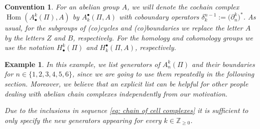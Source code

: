 \documentclass[10pt,a4paper]{amsart}
\numberwithin{equation}{section}
\newtheorem{Example}[Theorem]{Example}
\newtheorem{conve}[Theorem]{Convention}
\newcommand{\ZZ }{\mathbb{Z}}
\DeclareMathOperator{\Hom}{Hom}
\begin{document}
\begin{conve}
 For an abelian group $A$, we will denote the cochain complex $\Hom(A^k_\bullet(\Pi),A)$ by $A_k^\bullet(\Pi,A)$ with coboundary operators $\delta_k^{n-1}:=\big(\partial_n^k\big)^*$. As usual, for the subgroups of (co)cycles and (co)boundaries we replace the letter $A$ by the letters $Z$ and $B$, respectively. For the homology and cohomology groups we use the notation $H^k_\bullet(\Pi)$ and $H_k^\bullet(\Pi,A)$, respectively.
\end{conve}

\begin{Example}\allowdisplaybreaks
In this example, we list generators of $A^k_n(\Pi)$ and their boundaries for $n \in \{1,2,3,4,5,6\}$, since we are going to use them repeatedly in the following section. Moreover, we believe that an explicit list can be helpful for other people dealing with abelian chain complexes independently from our motivation.

Due to the inclusions in sequence \eqref{eq: chain of cell complexes} it is sufficient to only specify the new generators appearing for every $k \in \ZZ_{\geq 0}$.


\end{Example}
\end{document}

